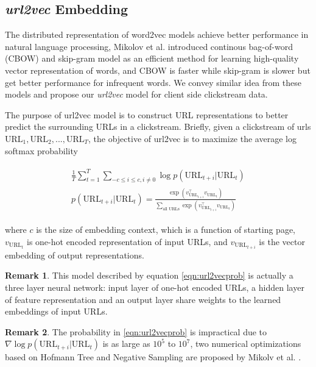 \subsection{\emph{url2vec} Embedding}

The distributed representation of word2vec models achieve better performance 
in natural language processing,
Mikolov et al. \cite{DBLP:journals/corr/abs-1301-3781} introduced 
continous bag-of-word (CBOW) and skip-gram model as an efficient method for learning high-quality
vector representation of words, and CBOW is faster while skip-gram is slower but get better
performance for infrequent words. We convey similar idea from these models and propose our
\emph{url2vec} model for client side clickstream data.

The purpose of url2vec model is to construct URL representations to better predict 
the surrounding URLs in a clickstream. Briefly, given a clickstream of urls 
$\text{URL}_1, \text{URL}_2, ..., \text{URL}_T$, the objective of url2vec is to maximize the average
log softmax probability

\begin{align}
\label{eqn:url2vecprob}
\begin{split}
    \frac{1}{T}\sum^{T}_{t=1}\sum_{-c \leq i \leq c, i \neq 0} {\log{p(\text{URL}_{t+i} | \text{URL}_t)}}\\
    p(\text{URL}_{t+i} | \text{URL}_t) = \frac{
        \exp{(v_{\text{URL}_{t+i}} ^\top v_{\text{URL}_t})}
    }{
        \sum_{\text{all URLs}} {\exp{(v_{\text{URL}_{t+i}} ^\top v_{\text{URL}_t})}}
    }
\end{split}
\end{align}

where $c$ is the size of embedding context, which is a function of starting page,
$v_{\text{URL}_t}$ is one-hot encoded representation of input URLs, and 
$v_{\text{URL}_{t+i}}$ is the vector embedding of output representations.

\textbf{Remark 1}. This model described by equation \ref{eqn:url2vecprob} is actually
a three layer neural network: input layer of one-hot encoded URLs, a hidden layer of
feature representation and an output layer share weights to the learned embeddings of 
input URLs.

\textbf{Remark 2}. The probability in \ref{eqn:url2vecprob} is impractical due to
$\nabla \log{p(\text{URL}_{t+i} | \text{URL}_t)}$ is as large as $10^5$ to $10^7$,
two numerical optimizations based on Hofmann Tree and Negative Sampling are proposed 
by Mikolv et al. \cite{mikolv2013embedding}.


